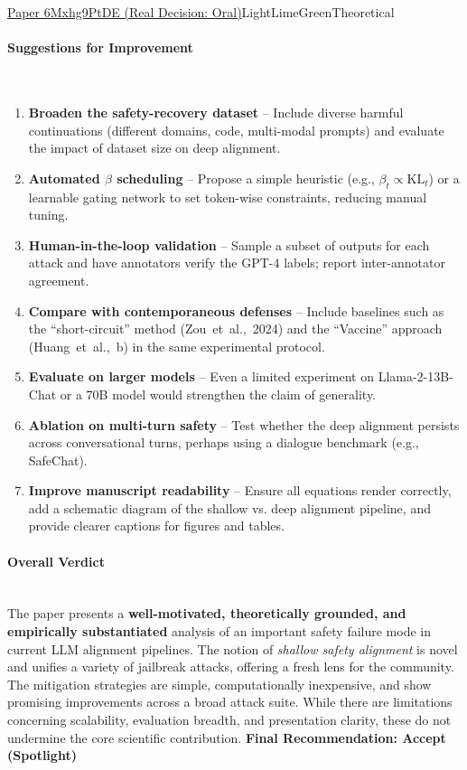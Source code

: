 \documentclass{article} %
\begin{document}
\begin{reviewbox}{\href{https://openreview.net/forum?id=6Mxhg9PtDE}{Paper 6Mxhg9PtDE (Real Decision: Oral)}}{LightLimeGreen}{Theoretical}
\paragraph{Suggestions for Improvement}\leavevmode\\[0.1em]
\begin{enumerate}[leftmargin=0.5em, itemsep=0pt, topsep=0pt]
    \item \textbf{Broaden the safety-recovery dataset} – Include diverse harmful continuations (different domains, code, multi-modal prompts) and evaluate the impact of dataset size on deep alignment.
    \item \textbf{Automated $\beta$ scheduling} – Propose a simple heuristic (e.g., $\beta_t \propto \mathrm{KL}_t$) or a learnable gating network to set token-wise constraints, reducing manual tuning.
    \item \textbf{Human-in-the-loop validation} – Sample a subset of outputs for each attack and have annotators verify the GPT-4 labels; report inter-annotator agreement.
    \item \textbf{Compare with contemporaneous defenses} – Include baselines such as the “short-circuit” method (Zou~et~al.,~2024) and the “Vaccine” approach (Huang~et~al.,~b) in the same experimental protocol.
    \item \textbf{Evaluate on larger models} – Even a limited experiment on Llama-2-13B-Chat or a 70B model would strengthen the claim of generality.
    \item \textbf{Ablation on multi-turn safety} – Test whether the deep alignment persists across conversational turns, perhaps using a dialogue benchmark (e.g., SafeChat).
    \item \textbf{Improve manuscript readability} – Ensure all equations render correctly, add a schematic diagram of the shallow vs. deep alignment pipeline, and provide clearer captions for figures and tables.
\end{enumerate}

\paragraph{Overall Verdict}\leavevmode\\[0.1em]
The paper presents a \textbf{well-motivated, theoretically grounded, and empirically substantiated} analysis of an important safety failure mode in current LLM alignment pipelines. The notion of \emph{shallow safety alignment} is novel and unifies a variety of jailbreak attacks, offering a fresh lens for the community. The mitigation strategies are simple, computationally inexpensive, and show promising improvements across a broad attack suite. While there are limitations concerning scalability, evaluation breadth, and presentation clarity, these do not undermine the core scientific contribution.
\textbf{Final Recommendation: Accept (Spotlight)}
\end{reviewbox}
\end{document}

